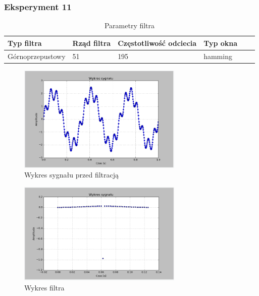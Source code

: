 \documentclass{article}
\begin{document}
{        \subsubsection{Eksperyment 11} {
            \begin{table}[h!]
            \centering
            \begin{tabular}{|l|l|l|l|l|l|}
            \hline
            Typ filtra & Rząd filtra & Częstotliwość odciecia & Typ okna  \\\hline
            Górnoprzepustowy & 51 & 195 & hamming     \\\hline
            \end{tabular}
            \caption{Parametry filtra}
            \end{table}
            \begin{figure}[h!]
                \centering
                \includegraphics[width=0.7\textwidth]{img/sig.png}
                \caption{Wykres sygnału przed filtracją}
            \end{figure}
            \begin{figure}[h!]
                \centering
                \includegraphics[width=0.7\textwidth]{img/fil21.png}
                \caption{Wykres filtra}
            \end{figure}

}}
\end{document}
